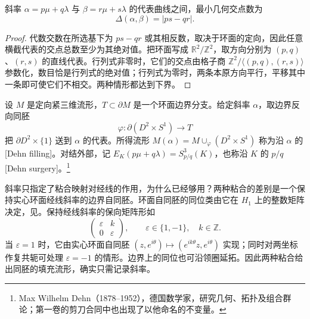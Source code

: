 \begin{proposition}\label{g2:prop:slope-intersection}
	斜率 \(\alpha=p\mu+q\lambda\) 与 \(\beta=r\mu+s\lambda\) 的代表曲线之间，最小几何交点数为
	\begin{equation}\label{g2:eq:slope-distance}
		\Delta(\alpha,\beta)=|ps-qr|.
	\end{equation}
\end{proposition}
\begin{proof}
	代数交数在所选基下为 \(ps-qr\) 或其相反数，取决于环面的定向，因此任意横截代表的交点总数至少为其绝对值。把环面写成 \(\mathbb R^2/\mathbb Z^2\)，取方向分别为 \((p,q)\)、\((r,s)\) 的直线代表。行列式非零时，它们的交点由格子商 \(\mathbb Z^2/\langle(p,q),(r,s)\rangle\) 参数化，数目恰是行列式的绝对值；行列式为零时，两条本原方向平行，平移其中一条即可使它们不相交。两种情形都达到下界。
\end{proof}

\begin{definition}\label{g2:def:dehn-filling}
	设 \(M\) 是定向紧三维流形，\(T\subset\partial M\) 是一个环面边界分支。给定斜率 \(\alpha\)，取边界反向同胚
	\[
		\varphi:\partial(D^2\times S^1)\longrightarrow T
	\]
	把 \(\partial D^2\times\{1\}\) 送到 \(\alpha\) 的代表。所得流形 \(M(\alpha)=M\cup_\varphi(D^2\times S^1)\) 称为沿 \(\alpha\) 的[Dehn filling]。对结外部，记 \(E_K(p\mu+q\lambda)=S^3_{p/q}(K)\)，也称沿 \(K\) 的 \(p/q\) [Dehn surgery]。\footnote{Max Wilhelm Dehn（1878--1952），德国数学家，研究几何、拓扑及组合群论；第一卷的剪刀合同中也出现了以他命名的不变量。}
\end{definition}

斜率只指定了粘合映射对经线的作用，为什么已经够用？两种粘合的差别是一个保持实心环面经线斜率的边界自同胚。环面自同胚的同位类由它在 \(H_1\) 上的整数矩阵决定，见\cite[第2章D节定理4]{Rolfsen2003Knots}。保持经线斜率的保向矩阵形如
\[
	\begin{pmatrix}\varepsilon&k\\0&\varepsilon\end{pmatrix},\qquad \varepsilon\in\{1,-1\},\quad k\in\mathbb Z.
\]
当 \(\varepsilon=1\) 时，它由实心环面自同胚 \((z,e^{i\theta})\mapsto(e^{ik\theta}z,e^{i\theta})\) 实现；同时对两坐标作复共轭可处理 \(\varepsilon=-1\) 的情形。边界上的同位也可沿领圈延拓。因此两种粘合给出同胚的填充流形，确实只需记录斜率。

